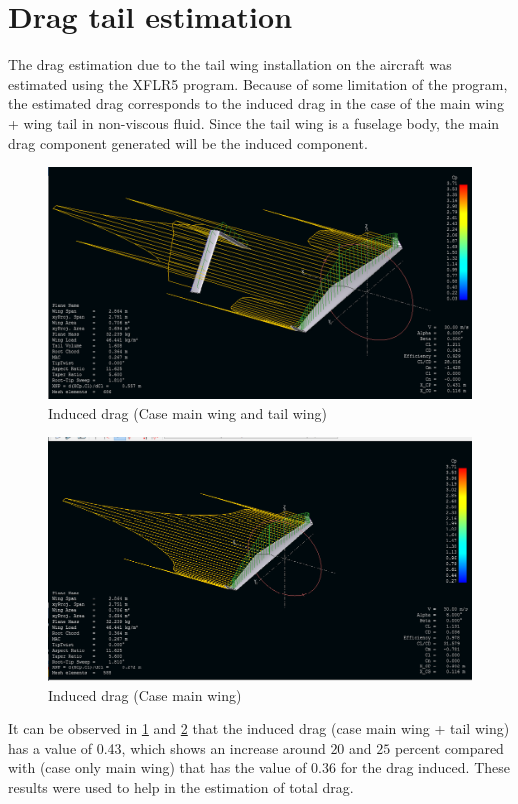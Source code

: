 \documentclass[english,fira]{ist-report}
\begin{document}
\section{Drag tail estimation}

The drag estimation due to the tail wing installation on the aircraft was estimated using the XFLR5 program. Because of some limitation of the program, the estimated drag corresponds to the induced drag in the case of the main wing + wing tail in non-viscous fluid. Since the tail wing is a fuselage body, the main drag component generated will be the induced component.

\begin{figure}[!ht]
	\centering
	\includegraphics[width = 0.8\linewidth]{graphics/aero_simulation_drag_w+wingtail.png}
	\caption{Induced drag (Case main wing and tail wing)}
	\label{fig:drag_w_wtail}
\end{figure}

\begin{figure}[!ht]
	\centering
	\includegraphics[width = 0.8\linewidth]{graphics/aero_simulation_drag_wing.png}
	\caption{Induced drag (Case main wing)}
	\label{fig:drag_wing}
\end{figure}

It can be observed in \ref{fig:drag_w_wtail} and \ref{fig:drag_wing} that the induced drag (case main wing + tail wing) has a value of 0.43, which shows an increase around $20$ and $25$ percent compared with (case only main wing) that has the value of 0.36 for the drag induced. These results were used to help in the estimation of total drag.
\end{document}
